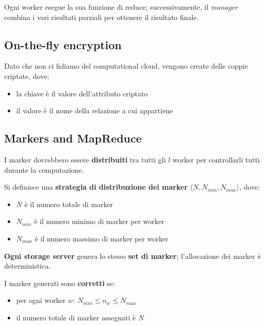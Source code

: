 \documentclass{report}
\begin{document}
\noindent Ogni worker esegue la sua funzione di reduce; successivamente, il \textit{manager} combina i vari risultati parziali 
per ottenere il risultato finale.

\subsection{On-the-fly encryption}
Dato che non ci fidiamo del computational cloud, 
vengono create delle coppie criptate, dove:
\begin{itemize}
    \item la chiave è il valore dell'attributo criptato 
    \item il valore è il nome della relazione a cui appartiene 
\end{itemize}


\subsection{Markers and MapReduce}

I marker dovrebbero essere \textbf{distribuiti} tra tutti gli $l$ worker per controllarli 
tutti durante la computazione.

\noindent Si definisce una \textbf{strategia di distribuzione dei marker} $\langle N, N_{min}, N_{max} \rangle$, dove:
\begin{itemize}
    \item $N$ è il numero totale di marker 
    \item $N_{min}$ è il numero minimo di marker per worker
    \item $N_{max}$ è il numero massimo di marker per worker 
\end{itemize}

\noindent \textbf{Ogni storage server} genera lo stesso \textbf{set di marker}; l'allocazione 
dei marker è deterministica.

\noindent I marker generati sono \textbf{corretti} se:
\begin{itemize}
    \item per ogni worker $w$: $N_{min} \leq n_w \leq N_{max}$
    \item il numero totale di marker assegnati è $N$
\end{itemize}
\end{document}
